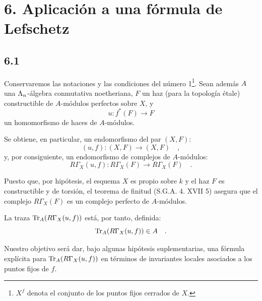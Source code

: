 \section*{6. Aplicación a una fórmula de Lefschetz}

\subsection*{6.1}
Conservaremos las notaciones y las condiciones del número 1\footnote{$X^f$ denota el conjunto de los puntos fijos cerrados de $X$.}. Sean además $A$ una $\Lambda_n$-álgebra conmutativa noetheriana, $F$ un haz (para la topología étale) constructible de $A$-módulos perfectos sobre $X$, y
\[
u : f^*(F) \longrightarrow F
\]
un homomorfismo de haces de $A$-módulos.

Se obtiene, en particular, un endomorfismo del par $(X, F)$:
\[
(u, f) : (X, F) \longrightarrow (X, F) \quad ,
\]
y, por consiguiente, un endomorfismo de complejos de $A$-módulos:
\[
R\Gamma_X(u, f) : R\Gamma_X(F) \longrightarrow R\Gamma_X(F) \quad .
\]

Puesto que, por hipótesis, el esquema $X$ es propio sobre $k$ y el haz $F$ es constructible y de torsión, el teorema de finitud (S.G.A. 4. XVII 5) asegura que el complejo $R\Gamma_X(F)$ es un complejo perfecto de $A$-módulos.

La traza $\operatorname{Tr}_A(R\Gamma_X(u, f))$ está, por tanto, definida:
\[
\operatorname{Tr}_A(R\Gamma_X(u, f)) \in A \quad .
\]

Nuestro objetivo será dar, bajo algunas hipótesis suplementarias, una fórmula explícita para $\operatorname{Tr}_A(R\Gamma_X(u, f))$ en términos de invariantes locales asociados a los puntos fijos de $f$.
